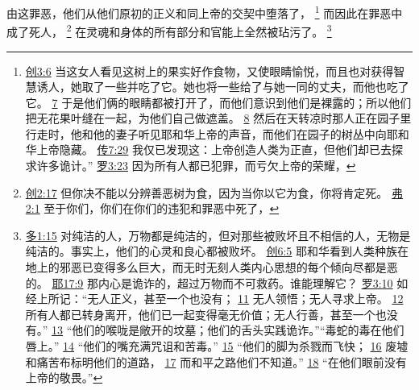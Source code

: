\documentclass[12pt, a4paper, oneside]{ctexart}
\newcounter{parnum}[section]
\newcommand{\N}{%
   \noindent\refstepcounter{parnum}%
    \makebox[\parindent][l]{\textbf{\arabic{parnum}.}}}
\begin{document}
\N 由这罪恶，他们从他们原初的正义和同上帝的交契中堕落了，
	\footnote {
		\href{https://biblehub.com/genesis/3-6.htm}{创3:6} 当这女人看见这树上的果实好作食物，又使眼睛愉悦，而且也对获得智慧诱人，她取了一些并吃了它。她也将一些给了与她一同的丈夫，而他也吃了它。
		\href{https://biblehub.com/genesis/3-7.htm}{7} 于是他们俩的眼睛都被打开了，而他们意识到他们是裸露的；所以他们把无花果叶缝在一起，为他们自己做遮盖。
		\href{https://biblehub.com/genesis/3-8.htm}{8} 然后在天转凉时那人正在园子里行走时，他和他的妻子听见耶和华上帝的声音，而他们在园子的树丛中向耶和华上帝隐藏。
		\href{https://biblehub.com/ecclesiastes/7-29.htm}{传7:29} 我仅已发现这：上帝创造人类为正直，但他们却已去探求许多诡计。”
		\href{https://biblehub.com/romans/3-23.htm}{罗3:23} 因为所有人都已犯罪，而亏欠上帝的荣耀，
	}
	而因此在罪恶中成了死人，
	\footnote {
		\href{https://biblehub.com/genesis/2-17.htm}{创2:17} 但你决不能以分辨善恶树为食，因为当你以它为食，你将肯定死。
		\href{https://biblehub.com/ephesians/2-1.htm}{弗2:1} 至于你们，你们在你们的违犯和罪恶中死了，
	}
	在灵魂和身体的所有部分和官能上全然被玷污了。
	\footnote {
		\href{https://biblehub.com/titus/1-15.htm}{多1:15} 对纯洁的人，万物都是纯洁的，但对那些被败坏且不相信的人，无物是纯洁的。事实上，他们的心灵和良心都被败坏。
		\href{https://biblehub.com/genesis/6-5.htm}{创6:5} 耶和华看到人类种族在地上的邪恶已变得多么巨大，而无时无刻人类内心思想的每个倾向尽都是恶的。
		\href{https://biblehub.com/jeremiah/17-9.htm}{耶17:9} 那内心是诡诈的，超过万物而不可救药。谁能理解它？
		\href{https://biblehub.com/romans/3-10.htm}{罗3:10} 如经上所记：“无人正义，甚至一个也没有；
		\href{https://biblehub.com/romans/3-11.htm}{11} 无人领悟；无人寻求上帝。
		\href{https://biblehub.com/romans/3-12.htm}{12} 所有人都已转身离开，他们已一起变得毫无价值；无人行善，甚至一个也没有。”
		\href{https://biblehub.com/romans/3-13.htm}{13} “他们的喉咙是敞开的坟墓；他们的舌头实践诡诈。”“毒蛇的毒在他们唇上。”
		\href{https://biblehub.com/romans/3-14.htm}{14} “他们的嘴充满咒诅和苦毒。”
		\href{https://biblehub.com/romans/3-15.htm}{15} “他们的脚为杀戮而飞快；
		\href{https://biblehub.com/romans/3-16.htm}{16} 废墟和痛苦布标明他们的道路，
		\href{https://biblehub.com/romans/3-17.htm}{17} 而和平之路他们不知道。”
		\href{https://biblehub.com/romans/3-18.htm}{18} “在他们眼前没有上帝的敬畏。”
	}
\end{document}
